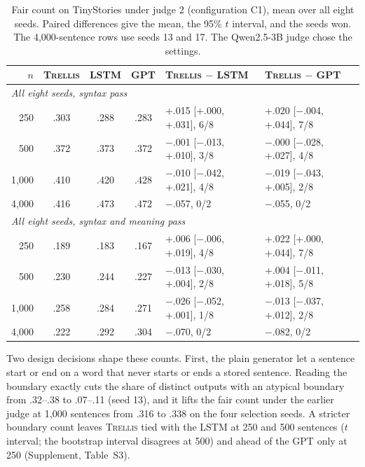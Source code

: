 \documentclass[11pt,letterpaper]{article}
\newcommand{\trellis}{\textsc{Trellis}}
\begin{document}
\begin{table}[!htbp]
\caption{Fair count on TinyStories under judge 2 (configuration C1), mean over all eight seeds. Paired differences give the mean, the 95\% $t$ interval, and the seeds won. The 4,000-sentence rows use seeds 13 and 17. The Qwen2.5-3B judge chose the settings.}
\label{tab:gen}
\begin{center}
\footnotesize
\begin{tabular}{rcccll}
\toprule
$n$ & \trellis{} & LSTM & GPT & \trellis{} $-$ LSTM & \trellis{} $-$ GPT \\
\midrule
\multicolumn{6}{l}{\textit{All eight seeds, syntax pass}} \\
250   & .303 & .288 & .283 & +.015 [+.000, +.031], 6/8 & +.020 [$-$.004, +.044], 7/8 \\
500   & .372 & .373 & .372 & $-$.001 [$-$.013, +.010], 3/8 & $-$.000 [$-$.028, +.027], 4/8 \\
1,000 & .410 & .420 & .428 & $-$.010 [$-$.042, +.021], 4/8 & $-$.019 [$-$.043, +.005], 2/8 \\
4,000 & .416 & .473 & .472 & $-$.057, 0/2 & $-$.055, 0/2 \\
\multicolumn{6}{l}{\textit{All eight seeds, syntax and meaning pass}} \\
250   & .189 & .183 & .167 & +.006 [$-$.006, +.019], 4/8 & +.022 [+.000, +.044], 7/8 \\
500   & .230 & .244 & .227 & $-$.013 [$-$.030, +.004], 2/8 & +.004 [$-$.011, +.018], 5/8 \\
1,000 & .258 & .284 & .271 & $-$.026 [$-$.052, +.001], 1/8 & $-$.013 [$-$.037, +.012], 2/8 \\
4,000 & .222 & .292 & .304 & $-$.070, 0/2 & $-$.082, 0/2 \\
\bottomrule
\end{tabular}
\end{center}
\end{table}

Two design decisions shape these counts. First, the plain generator let a sentence start or end on a word that never starts or ends a stored sentence.
Reading the boundary exactly cuts the share of distinct outputs with an atypical boundary from .32--.38 to .07--.11 (seed 13), and it lifts the fair count under the earlier judge at 1,000 sentences from .316 to .338 on the four selection seeds.
A stricter boundary count leaves \trellis{} tied with the LSTM at 250 and 500 sentences ($t$ interval; the bootstrap interval disagrees at 500) and ahead of the GPT only at 250 (Supplement, Table~S3).
\end{document}
